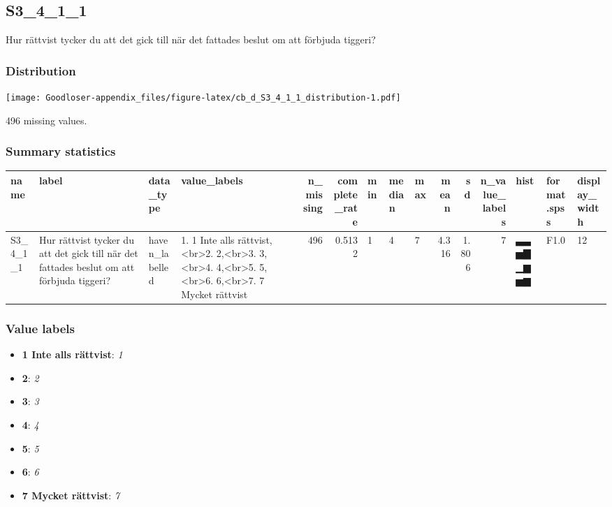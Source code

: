 \documentclass[
]{book}
\providecommand{\tightlist}{%
  \setlength{\itemsep}{0pt}\setlength{\parskip}{0pt}}
\begin{document}
\hypertarget{S3_4_1_1}{%
\subsection{S3\_4\_1\_1}\label{S3_4_1_1}}

Hur rättvist tycker du att det gick till när det fattades beslut om att förbjuda tiggeri?

\hypertarget{S3_4_1_1_distribution}{%
\subsubsection{Distribution}\label{S3_4_1_1_distribution}}

\texttt{[image: Goodloser-appendix\_files/figure-latex/cb\_d\_S3\_4\_1\_1\_distribution-1.pdf]}

496 missing values.

\hypertarget{S3_4_1_1_summary}{%
\subsubsection{Summary statistics}\label{S3_4_1_1_summary}}

\begin{tabular}{l|l|l|l|r|r|l|l|l|r|r|r|l|l|l}
\hline
name & label & data_type & value_labels & n_missing & complete_rate & min & median & max & mean & sd & n_value_labels & hist & format.spss & display_width\\
\hline
S3_4_1_1 & Hur rättvist tycker du att det gick till när det fattades beslut om att förbjuda tiggeri? & haven_labelled & 1. 1 Inte alls rättvist,<br>2. 2,<br>3. 3,<br>4. 4,<br>5. 5,<br>6. 6,<br>7. 7 Mycket rättvist & 496 & 0.5132 & 1 & 4 & 7 & 4.316 & 1.806 & 7 & ▃▃▅▇▁▆▅▆ & F1.0 & 12\\
\hline
\end{tabular}

\hypertarget{S3_4_1_1_labels}{%
\subsubsection{Value labels}\label{S3_4_1_1_labels}}

\begin{itemize}
\tightlist
\item
  \textbf{1 Inte alls rättvist}: \emph{1}
\item
  \textbf{2}: \emph{2}
\item
  \textbf{3}: \emph{3}
\item
  \textbf{4}: \emph{4}
\item
  \textbf{5}: \emph{5}
\item
  \textbf{6}: \emph{6}
\item
  \textbf{7 Mycket rättvist}: \emph{7}
\end{itemize}
\end{document}
